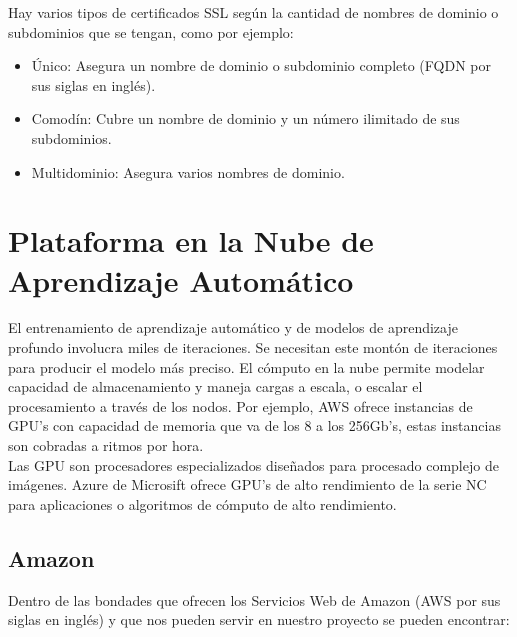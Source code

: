 \documentclass[12pt, a4paper, titlepage]{report}
\begin{document}
			Hay varios tipos de certificados SSL según la cantidad de nombres de dominio o subdominios que se tengan, como por ejemplo:
			
			\begin{itemize}
				\item \'Unico: Asegura un nombre de dominio o subdominio completo (FQDN por sus siglas en ingl\'es). 
				\item Comod\'in: Cubre un nombre de dominio y un n\'umero ilimitado de sus subdominios.
				\item Multidominio: Asegura varios nombres de dominio.
			\end{itemize}
		
		\newpage
		\section{Plataforma en la Nube de Aprendizaje Autom\'atico}
		
		El entrenamiento de aprendizaje automático y de modelos de aprendizaje profundo involucra miles de iteraciones. Se necesitan este montón de iteraciones para producir el modelo más preciso. El cómputo en la nube permite modelar capacidad de almacenamiento y maneja cargas a escala, o escalar el procesamiento a través de los nodos. Por ejemplo, AWS ofrece instancias de GPU’s con capacidad de memoria que va de los 8 a los 256Gb's, estas instancias son cobradas a ritmos por hora.\\
		Las GPU son procesadores especializados diseñados para procesado complejo de imágenes. Azure de Microsift ofrece GPU's de alto rendimiento de la serie NC para aplicaciones o algoritmos de cómputo de alto rendimiento.
		
		\subsection{Amazon}
		Dentro de las bondades que ofrecen los Servicios Web de Amazon (AWS por sus siglas en ingl\'es) y que nos pueden servir en nuestro proyecto se pueden encontrar: 
		
\end{document}
